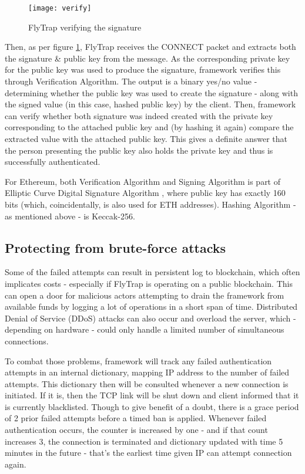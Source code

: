 \begin{figure}[h]
    \centering
    \texttt{[image: verify]}
    \caption{FlyTrap verifying the signature}
    \label{fig:verify}
\end{figure}

Then, as per figure \ref{fig:verify}, FlyTrap receives the CONNECT packet and extracts both the signature \& public key from the message. As the corresponding private key for the public key was used to produce the signature, framework verifies this through Verification Algorithm. The output is a binary yes/no value - determining whether the public key was used to create the signature - along with the signed value (in this case, hashed public key) by the client. Then, framework can verify whether both signature was indeed created with the private key corresponding to the attached public key and (by hashing it again) compare the extracted value with the attached public key. This gives a definite answer that the person presenting the public key also holds the private key and thus is successfully authenticated.

For Ethereum, both Verification Algorithm and Signing Algorithm is part of Elliptic Curve Digital Signature Algorithm \citep{johnson2001elliptic}, where public key has exactly 160 bits (which, coincidentally, is also used for ETH addresses). Hashing Algorithm - as mentioned above - is Keccak-256.
\subsection{Protecting from brute-force attacks}
Some of the failed attempts can result in persistent log to blockchain, which often implicates costs - especially if FlyTrap is operating on a public blockchain. This can open a door for malicious actors attempting to drain the framework from available funds by logging a lot of operations in a short span of time. Distributed Denial of Service (DDoS) attacks can also occur and overload the server, which - depending on hardware - could only handle a limited number of simultaneous connections.

To combat those problems, framework will track any failed authentication attempts in an internal dictionary, mapping IP address to the number of failed attempts. This dictionary then will be consulted whenever a new connection is initiated. If it is, then the TCP link will be shut down and client informed that it is currently blacklisted. Though to give benefit of a doubt, there is a grace period of 2 prior failed attempts before a timed ban is applied. Whenever failed authentication occurs, the counter is increased by one - and if that count increases 3, the connection is terminated and dictionary updated with time 5 minutes in the future - that's the earliest time given IP can attempt connection again.
